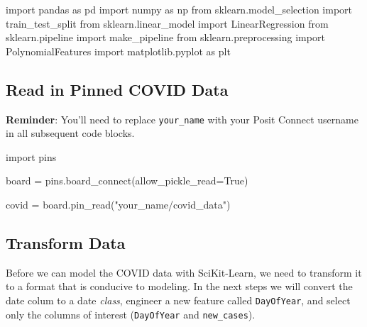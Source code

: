 \documentclass[
  letterpaper,
  DIV=11,
  numbers=noendperiod]{scrreprt}
\newenvironment{Shaded}{\begin{snugshade}}{\end{snugshade}}
\newcommand{\ImportTok}[1]{\textcolor[rgb]{0.00,0.46,0.62}{#1}}
\newcommand{\NormalTok}[1]{\textcolor[rgb]{0.00,0.23,0.31}{#1}}
\newcommand{\OperatorTok}[1]{\textcolor[rgb]{0.37,0.37,0.37}{#1}}
\newcommand{\StringTok}[1]{\textcolor[rgb]{0.13,0.47,0.30}{#1}}
\newcommand{\VariableTok}[1]{\textcolor[rgb]{0.07,0.07,0.07}{#1}}
\begin{document}
\begin{Shaded}
\begin{Highlighting}[]
\ImportTok{import}\NormalTok{ pandas }\ImportTok{as}\NormalTok{ pd}
\ImportTok{import}\NormalTok{ numpy }\ImportTok{as}\NormalTok{ np}
\ImportTok{from}\NormalTok{ sklearn.model\_selection }\ImportTok{import}\NormalTok{ train\_test\_split}
\ImportTok{from}\NormalTok{ sklearn.linear\_model }\ImportTok{import}\NormalTok{ LinearRegression}
\ImportTok{from}\NormalTok{ sklearn.pipeline }\ImportTok{import}\NormalTok{ make\_pipeline}
\ImportTok{from}\NormalTok{ sklearn.preprocessing }\ImportTok{import}\NormalTok{ PolynomialFeatures}
\ImportTok{import}\NormalTok{ matplotlib.pyplot }\ImportTok{as}\NormalTok{ plt}
\end{Highlighting}
\end{Shaded}

\subsection{Read in Pinned COVID Data}\label{read-in-pinned-covid-data}

\textbf{Reminder}: You'll need to replace \texttt{your\_name} with your
Posit Connect username in all subsequent code blocks.

\begin{Shaded}
\begin{Highlighting}[]
\ImportTok{import}\NormalTok{ pins}

\NormalTok{board }\OperatorTok{=}\NormalTok{ pins.board\_connect(allow\_pickle\_read}\OperatorTok{=}\VariableTok{True}\NormalTok{)}

\NormalTok{covid }\OperatorTok{=}\NormalTok{ board.pin\_read(}\StringTok{"your\_name/covid\_data"}\NormalTok{)}
\end{Highlighting}
\end{Shaded}

\subsection{Transform Data}\label{transform-data}

Before we can model the COVID data with SciKit-Learn, we need to
transform it to a format that is conducive to modeling. In the next
steps we will convert the date colum to a date \emph{class}, engineer a
new feature called \texttt{DayOfYear}, and select only the columns of
interest (\texttt{DayOfYear} and \texttt{new\_cases}).
\end{document}
